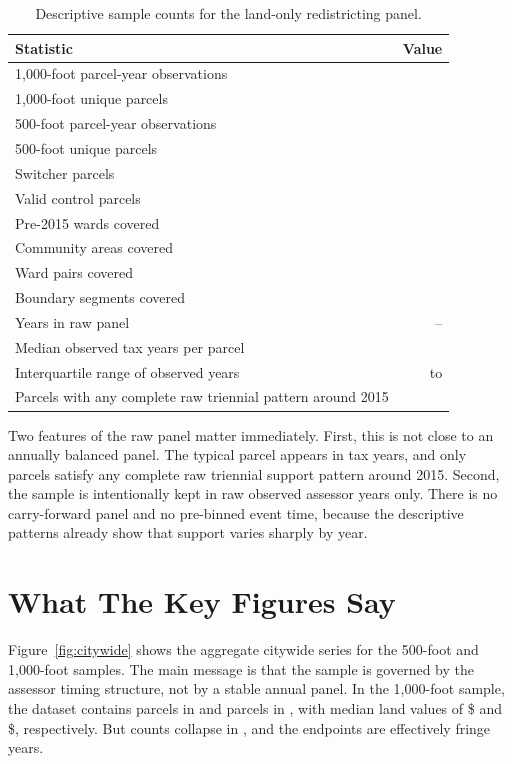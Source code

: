 \documentclass[11pt]{article}
\begin{document}
\begin{table}[h]
\centering
\begin{tabular}{lr}
\toprule
Statistic & Value \\
\midrule
1,000-foot parcel-year observations & \PanelRows{} \\
1,000-foot unique parcels & \PanelPins{} \\
500-foot parcel-year observations & \SubsetRows{} \\
500-foot unique parcels & \SubsetPins{} \\
Switcher parcels & \SwitcherPins{} \\
Valid control parcels & \ValidControlPins{} \\
Pre-2015 wards covered & \WardCount{} \\
Community areas covered & \CommunityAreaCount{} \\
Ward pairs covered & \WardPairCount{} \\
Boundary segments covered & \SegmentCount{} \\
Years in raw panel & \FirstYear{}--\LastYear{} \\
Median observed tax years per parcel & \MedianObservedYears{} \\
Interquartile range of observed years & \ObservedYearsPtf{} to \ObservedYearsPsf{} \\
Parcels with any complete raw triennial pattern around 2015 & \BalancedAnyPins{} \\
\bottomrule
\end{tabular}
\caption{Descriptive sample counts for the land-only redistricting panel.}
\end{table}

Two features of the raw panel matter immediately. First, this is not close to an annually balanced panel. The typical parcel appears in \MedianObservedYears{} tax years, and only \BalancedAnyPins{} parcels satisfy any complete raw triennial support pattern around 2015. Second, the sample is intentionally kept in raw observed assessor years only. There is no carry-forward panel and no pre-binned event time, because the descriptive patterns already show that support varies sharply by year.

\section*{What The Key Figures Say}

Figure~\ref{fig:citywide} shows the aggregate citywide series for the 500-foot and 1,000-foot samples. The main message is that the sample is governed by the assessor timing structure, not by a stable annual panel. In the 1,000-foot sample, the dataset contains \PreRedistrictPins{} parcels in \PreRedistrictYear{} and \PostRedistrictPins{} parcels in \PostRedistrictYear{}, with median land values of \$\PreRedistrictMedianLand{} and \$\PostRedistrictMedianLand{}, respectively. But counts collapse in \ThinYearList{}, and the endpoints \FringeYearList{} are effectively fringe years.
\end{document}
